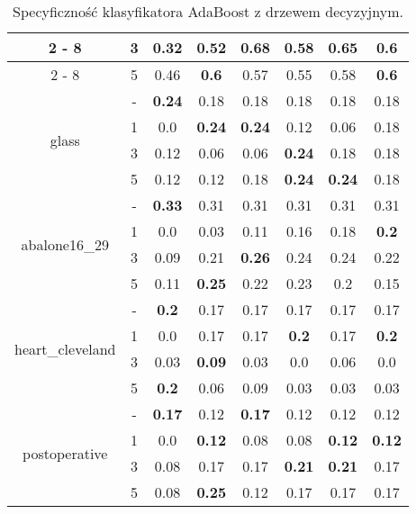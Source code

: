 \begin{table}[H]
\begin{center}
{\begin{tabular}{c|c|cccccc}
					\cline{2%
						-%
						8}%
					&3&0.32&0.52&\textbf{0.68}&0.58&0.65&0.6\\%
					\cline{2%
						-%
						8}%
					&5&0.46&\textbf{0.6}&0.57&0.55&0.58&\textbf{0.6}\\%
					\hline%
					\multirow{4}{*}{glass}&{-}&\textbf{0.24}&0.18&0.18&0.18&0.18&0.18\\%
					\cline{2%
						-%
						8}%
					&1&0.0&\textbf{0.24}&\textbf{0.24}&0.12&0.06&0.18\\%
					\cline{2%
						-%
						8}%
					&3&0.12&0.06&0.06&\textbf{0.24}&0.18&0.18\\%
					\cline{2%
						-%
						8}%
					&5&0.12&0.12&0.18&\textbf{0.24}&\textbf{0.24}&0.18\\%
					\hline%
					\multirow{4}{*}{abalone16\_29}&{-}&\textbf{0.33}&0.31&0.31&0.31&0.31&0.31\\%
					\cline{2%
						-%
						8}%
					&1&0.0&0.03&0.11&0.16&0.18&\textbf{0.2}\\%
					\cline{2%
						-%
						8}%
					&3&0.09&0.21&\textbf{0.26}&0.24&0.24&0.22\\%
					\cline{2%
						-%
						8}%
					&5&0.11&\textbf{0.25}&0.22&0.23&0.2&0.15\\%
					\hline%
					\multirow{4}{*}{heart\_cleveland}&{-}&\textbf{0.2}&0.17&0.17&0.17&0.17&0.17\\%
					\cline{2%
						-%
						8}%
					&1&0.0&0.17&0.17&\textbf{0.2}&0.17&\textbf{0.2}\\%
					\cline{2%
						-%
						8}%
					&3&0.03&\textbf{0.09}&0.03&0.0&0.06&0.0\\%
					\cline{2%
						-%
						8}%
					&5&\textbf{0.2}&0.06&0.09&0.03&0.03&0.03\\%
					\hline%
					\multirow{4}{*}{postoperative}&{-}&\textbf{0.17}&0.12&\textbf{0.17}&0.12&0.12&0.12\\%
					\cline{2%
						-%
						8}%
					&1&0.0&\textbf{0.12}&0.08&0.08&\textbf{0.12}&\textbf{0.12}\\%
					\cline{2%
						-%
						8}%
					&3&0.08&0.17&0.17&\textbf{0.21}&\textbf{0.21}&0.17\\%
					\cline{2%
						-%
						8}%
					&5&0.08&\textbf{0.25}&0.12&0.17&0.17&0.17\\%
					\hline%
					\end{tabular}}
					
					\caption{Specyficzność klasyfikatora AdaBoost z drzewem decyzyjnym.}
					\label{adaspecyficznosc}
				\end{center}
			\end{table}

